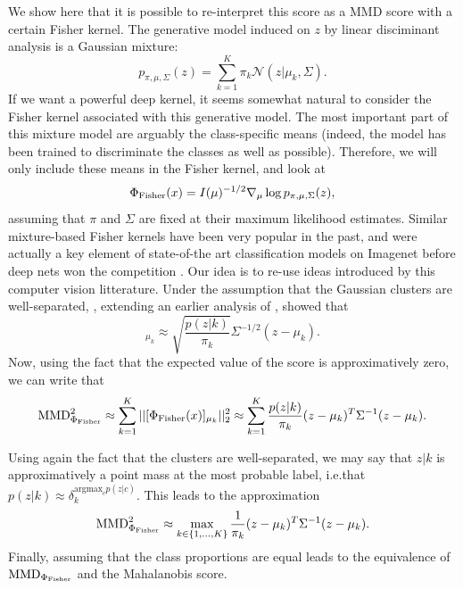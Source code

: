 {We show here that it is possible to re-interpret this score as a MMD score with a certain Fisher kernel. 
The generative model induced on $z$ by linear disciminant analysis is a Gaussian mixture:
\begin{equation}
    p_{\pi, \mu , \Sigma }(z) = \sum_{k=1}^K \pi_k \mathcal{N}(z | \mu_k, \Sigma).
\end{equation}
If we want a powerful deep kernel, it seems somewhat natural to consider the Fisher kernel associated with this generative model. The most important part of this mixture model are arguably the class-specific means (indeed, the model has been trained to discriminate the classes as well as possible). Therefore, we will only include these means in the Fisher kernel, and look at
\begin{equation}
	\Phi_\textup{Fisher} (x) = I(\mu)^{-1/2} \nabla_\mu  \log p_{\pi, \mu , \Sigma }(z),
\end{equation}
assuming that $\pi$ and $\Sigma$ are fixed at their maximum likelihood estimates. Similar mixture-based Fisher kernels have been very popular in the past, and were actually a key element of state-of-the art classification models on Imagenet before deep nets won the competition \citep{perronnin_improving_2010}. Our idea is to re-use ideas introduced by this computer vision litterature. Under the assumption that the Gaussian clusters are well-separated, \textcite{tanaka_fisher_2013}, extending an earlier analysis of \textcite[Appendix A]{sanchez_image_2013}, showed that
\begin{equation}
	[\Phi_\textup{Fisher} (x)]_{\mu_k} \approx \sqrt{\frac{p(z|k)}{\pi_k }}  \Sigma^{-1/2} (z - \mu_k).
\end{equation}
Now, using the fact that the expected value of the score is approximatively zero, we can write that
\begin{equation}
    \textup{MMD}_{\Phi_\textup{Fisher}}^2 \approx \sum_{k=1}^K  || [\Phi_\textup{Fisher} (x)]_{\mu_k} ||_2^2 \approx \sum_{k=1}^K \frac{p(z|k)}{\pi_k} (z - \mu_k)^T \Sigma^{-1} (z - \mu_k).
\end{equation}



Using again the fact that the clusters are well-separated, we may say that $z|k$ is approximatively a point mass at the most probable label,  i.e.\@ that $p(z|k) \approx \delta_k^{\text{argmax}_c p(z|c)}$. This leads to the approximation 
\begin{equation}
    \textup{MMD}_{\Phi_\textup{Fisher}}^2 \approx \max_{k \in \{1,...,K\}} \frac{1}{\pi_k} (z - \mu_k)^T \Sigma^{-1} (z - \mu_k).
\end{equation}
Finally, assuming that the class proportions are equal leads to the equivalence of $\textup{MMD}_{\Phi_\textup{Fisher}}$ and the Mahalanobis score.




}
